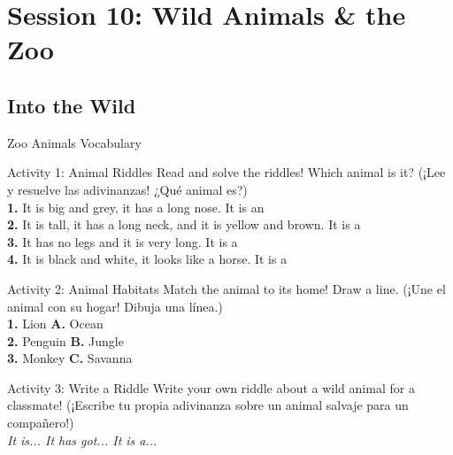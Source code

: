 \section*{Session 10: Wild Animals \& the Zoo}
\subsection*{Into the Wild}

\begin{vocabcard}{Zoo Animals Vocabulary}
\end{vocabcard}

\begin{activity}{Activity 1: Animal Riddles}
  Read and solve the riddles! Which animal is it? (¡Lee y resuelve las adivinanzas! ¿Qué animal es?)\\
  \textbf{1.} It is big and grey, it has a long nose. It is an \answerline[3cm] \\
  \textbf{2.} It is tall, it has a long neck, and it is yellow and brown. It is a \answerline[3cm] \\
  \textbf{3.} It has no legs and it is very long. It is a \answerline[3cm] \\
  \textbf{4.} It is black and white, it looks like a horse. It is a \answerline[3cm]
\end{activity}

\begin{activity}{Activity 2: Animal Habitats}
  Match the animal to its home! Draw a line. (¡Une el animal con su hogar! Dibuja una línea.)\\[1em]
  \textbf{1.} Lion \hspace{3cm} \textbf{A.} Ocean\\
  \textbf{2.} Penguin \hspace{2.4cm} \textbf{B.} Jungle\\
  \textbf{3.} Monkey \hspace{2.5cm} \textbf{C.} Savanna
\end{activity}

\begin{activity}{Activity 3: Write a Riddle}
  Write your own riddle about a wild animal for a classmate! (¡Escribe tu propia adivinanza sobre un animal salvaje para un compañero!)\\
  \emph{It is... It has got... It is a...}\\
  \writinglines[3]
\end{activity}


